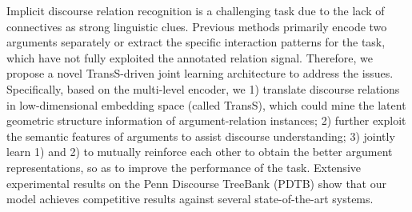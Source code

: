 Implicit discourse relation recognition is a challenging task due to the lack of connectives as strong linguistic clues. Previous methods primarily encode two arguments separately or extract the specific interaction patterns for the task, which have not fully exploited the annotated relation signal. Therefore, we propose a novel TransS-driven joint learning architecture to address the issues. Specifically, based on the multi-level encoder, we 1) translate discourse relations in low-dimensional embedding space (called TransS), which could mine the latent geometric structure information of argument-relation instances; 2) further exploit the semantic features of arguments to assist discourse understanding; 3) jointly learn 1) and 2) to mutually reinforce each other to obtain the better argument representations, so as to improve the performance of the task. Extensive experimental results on the Penn Discourse TreeBank (PDTB) show that our model achieves competitive results against several state-of-the-art systems.
